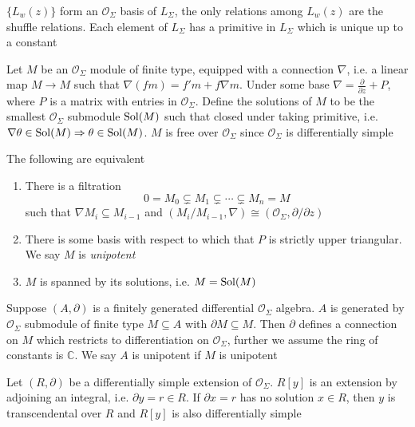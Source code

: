 \documentclass[main]{subfiles}
\begin{document}
\begin{corollary}
$\{L_w(z)\}$ form an $\mathcal O_\Sigma$ basis of $L_\Sigma$, the only relations among $L_w(z)$ are the shuffle relations. Each element of $L_\Sigma$ has a primitive in $L_\Sigma$ which is unique up to a constant
\end{corollary}

\begin{definition}
Let $M$ be an $\mathcal O_\Sigma$ module of finite type, equipped with a connection $\nabla$, i.e. a linear map $M\to M$ such that $\nabla(fm)=f'm+f\nabla m$. Under some base $\nabla=\frac{\partial}{\partial z}+P$, where $P$ is a matrix with entries in $\mathcal O_\Sigma$. Define the solutions of $M$ to be the smallest $\mathcal O_\Sigma$ submodule $\operatorname{Sol}(M)$ such that closed under taking primitive, i.e. $\nabla\theta\in \operatorname{Sol}(M)\Rightarrow\theta\in \operatorname{Sol}(M)$. $M$ is free over $\mathcal O_\Sigma$ since $\mathcal O_\Sigma$ is differentially simple
\end{definition}

\begin{lemma}
The following are equivalent
\begin{enumerate}
\item There is a filtration\[0=M_0\subsetneq M_1\subsetneq \cdots\subsetneq M_n=M\]such that $\nabla M_i\subseteq M_{i-1}$ and $(M_i/M_{i-1},\nabla)\cong(\mathcal O_\Sigma,\partial/\partial z)$
\item There is some basis with respect to which that $P$ is strictly upper triangular. We say $M$ is \textit{unipotent}
\item $M$ is spanned by its solutions, i.e. $M=\operatorname{Sol}(M)$
\end{enumerate}
\end{lemma}

\begin{definition}
Suppose $(A,\partial)$ is a finitely generated differential $\mathcal O_\Sigma$ algebra. $A$ is generated by $\mathcal O_\Sigma$ submodule of finite type $M\subseteq A$ with $\partial M\subseteq M$. Then $\partial$ defines a connection on $M$ which restricts to differentiation on $\mathcal O_\Sigma$, further we assume the ring of constants is $\mathbb C$. We say $A$ is unipotent if $M$ is unipotent
\end{definition}

\begin{lemma}
Let $(R,\partial)$ be a differentially simple extension of $\mathcal O_\Sigma$. $R[y]$ is an extension by adjoining an integral, i.e. $\partial y=r\in R$. If $\partial x=r$ has no solution $x\in R$, then $y$ is transcendental over $R$ and $R[y]$ is also differentially simple
\end{lemma}
\end{document}
